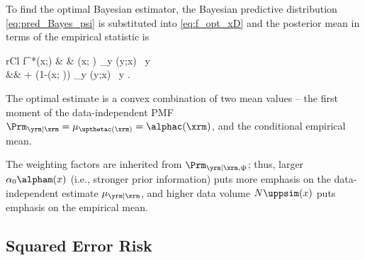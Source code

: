 \documentclass{article}
\begin{document}
	To find the optimal Bayesian estimator, the Bayesian predictive distribution \eqref{eq:pred_Bayes_psi} is substituted into \eqref{eq:f_opt_xD} and the posterior mean in terms of the empirical statistic is
	\begin{IEEEeqnarray}{rCl} \label{eq:f_opt_SE}
		f^*(x;\psi) & \equiv & \gamma(x; \psim) \sum_{y \in \Ycal} \alphac(y;x) \ y \\
		&& \quad + \big(1-\gamma(x; \psim)\big) \sum_{y \in \Ycal} \psic(y;x) \ y \nonumber \;.
	\end{IEEEeqnarray}
	The optimal estimate is a convex combination of two mean values -- the first moment of the data-independent PMF $\Prm_{\yrm | \xrm} = \mu_{\upthetac(\xrm)} = \alphac(\xrm)$, and the conditional empirical mean.
	
	The weighting factors are inherited from $\Prm_{\yrm | \xrm,\uppsi}$; thus, larger $\alpha_0 \alpham(x)$ (i.e., stronger prior information) puts more emphasis on the data-independent estimate $\mu_{\yrm|\xrm}$, and higher data volume $N \uppsim(x)$ puts emphasis on the empirical mean.
	
	
	
	
	
	\subsection{Squared Error Risk}
	
	
\end{document}

